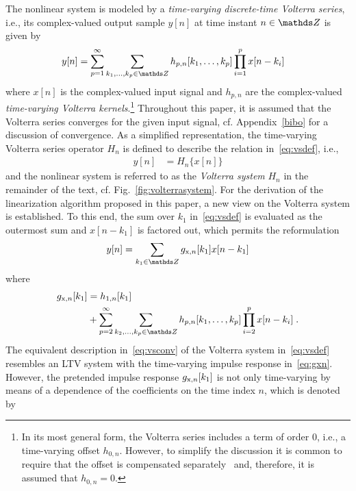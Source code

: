 \documentclass[10pt,twocolumn,twoside]{IEEEtran}
\begin{document}
The nonlinear system is modeled by a \emph{time-varying discrete-time Volterra series}, i.e.,
its complex-valued output sample $y[n]$ at time instant $n\in\Z$ is given
by~\cite{schetzen1980,rugh1981,mathews2000}
\begin{align}
	y[n] &= \sum_{p=1}^\infty \sum_{k_1,\dots,k_p\in\Z} h_{p,n}[k_1,\dots,k_p]\prod_{i=1}^p x[n-k_i]
	\label{eq:vsdef}
\end{align}
where $x[n]$ is the complex-valued input signal and $h_{p,n}$ are the
complex-valued \emph{time-varying Volterra
kernels}.\footnote{In its most general form, the Volterra series includes a term of order $0$,
i.e., a time-varying offset $h_{0,n}$. However, to simplify the discussion it is common
to require that the offset is compensated separately~\cite{mathews1991} and, therefore,
it is assumed that $h_{0,n}=0$.} Throughout this paper, it is assumed that the Volterra series
converges for the given input signal, cf. Appendix~\ref{bibo} for a discussion of convergence.
As a simplified representation, the time-varying Volterra series operator $H_n$ is defined
to describe the relation in~\eqref{eq:vsdef}, i.e.,
\begin{align}
	y[n] &= H_n\{x[n]\}
	\label{eq:hndef}
\end{align}
and the nonlinear system is referred to as the \emph{Volterra system} $H_n$ in the remainder
of the text, cf. Fig.~\ref{fig:volterrasystem}.
For the derivation of the linearization algorithm proposed in this paper,
a new view on the Volterra system is established.
To this end, the sum over $k_1$ in~\eqref{eq:vsdef} is evaluated as the outermost
sum and $x[n-k_1]$ is factored out, which permits the reformulation
\begin{align}
	y[n] = \sum_{k_1\in\Z} \sg{x}{n}[k_1] x[n-k_1]
	\label{eq:vsconv}
\end{align}
where
\begin{align}
	\begin{split}
	\sg{x}{n}[k_1] &= h_{1,n}[k_1] \\
		&+ \sum_{p=2}^\infty \sum_{k_2,\ldots,k_p\in\Z}
			 h_{p,n}[k_1,\ldots,k_p]\prod_{i=2}^p x[n-k_i]\;.
	\end{split}
	\label{eq:gxn}
\end{align}
The equivalent description in~\eqref{eq:vsconv} of the Volterra system
in~\eqref{eq:vsdef} resembles an LTV system with the time-varying impulse response
in~\eqref{eq:gxn}. However, the pretended impulse response $g_{\mathrm{x},n}[k_1]$ is not only time-varying
by means of a dependence of the coefficients on the time index $n$, which is denoted by
\end{document}
